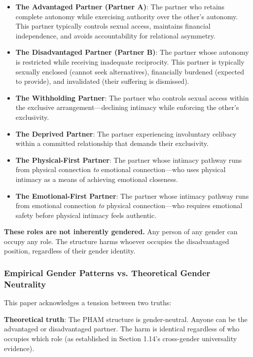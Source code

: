 \documentclass[12pt, letterpaper]{article}
\begin{document}
\begin{itemize}
    \item \textbf{The Advantaged Partner (Partner A)}: The partner who retains complete autonomy while exercising authority over the other's autonomy. This partner typically controls sexual access, maintains financial independence, and avoids accountability for relational asymmetry.
    
    \item \textbf{The Disadvantaged Partner (Partner B)}: The partner whose autonomy is restricted while receiving inadequate reciprocity. This partner is typically sexually enclosed (cannot seek alternatives), financially burdened (expected to provide), and invalidated (their suffering is dismissed).
    
    \item \textbf{The Withholding Partner}: The partner who controls sexual access within the exclusive arrangement---declining intimacy while enforcing the other's exclusivity.
    
    \item \textbf{The Deprived Partner}: The partner experiencing involuntary celibacy within a committed relationship that demands their exclusivity.
    
    \item \textbf{The Physical-First Partner}: The partner whose intimacy pathway runs from physical connection \textit{to} emotional connection---who uses physical intimacy as a means of achieving emotional closeness.
    
    \item \textbf{The Emotional-First Partner}: The partner whose intimacy pathway runs from emotional connection \textit{to} physical connection---who requires emotional safety before physical intimacy feels authentic.
\end{itemize}

\textbf{These roles are not inherently gendered.} Any person of any gender can occupy any role. The structure harms whoever occupies the disadvantaged position, regardless of their gender identity.

\subsubsection{Empirical Gender Patterns vs. Theoretical Gender Neutrality}

This paper acknowledges a tension between two truths:

\textbf{Theoretical truth}: The PHAM structure is gender-neutral. Anyone can be the advantaged or disadvantaged partner. The harm is identical regardless of who occupies which role (as established in Section 1.14's cross-gender universality evidence).
\end{document}
